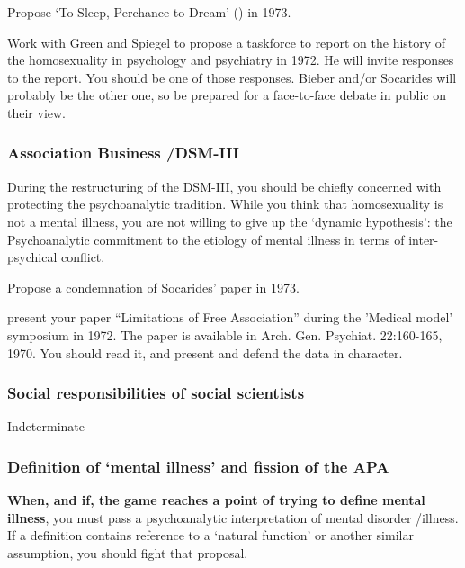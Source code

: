 \begin{refsection}
\begin{researchtask}[Marmor]\label{researchtask:marmor}Propose ‘To Sleep, Perchance to Dream’ () in 1973.
\end{researchtask}

Work with Green and Spiegel to propose a taskforce to report on the history of the homosexuality in psychology and psychiatry in 1972. He will invite responses to the report. You should be one of those responses. Bieber and\slash or Socarides will probably be the other one, so be prepared for a face-to-face debate in public on their view.

\subsubsection{Association Business \slash  DSM-III}
\label{associationbusinessdsm-iii}

During the restructuring of the DSM-III, you should be chiefly concerned with protecting the psychoanalytic tradition. While you think that homosexuality is not a mental illness, you are not willing to give up the `dynamic hypothesis': the Psychoanalytic commitment to the etiology of mental illness in terms of inter-psychical conflict.

Propose a condemnation of Socarides’ paper in 1973.
\begin{writingtask}[Marmor]\label{writingtask:marmor}
present your paper “Limitations of Free Association” during the 'Medical model' symposium in 1972. The paper is available in Arch. Gen. Psychiat. 22:160-165, 1970. You should read it, and present and defend the data in character.
\end{writingtask}

\subsubsection{Social responsibilities of social scientists}
\label{socialresponsibilitiesofsocialscientists}

Indeterminate

\subsubsection{Definition of ‘mental illness’ and fission of the APA}
\label{definitionof‘mentalillness’andfissionoftheapa}

\textbf{When, and if, the game reaches a point of trying to define mental illness}, you must pass a psychoanalytic interpretation of mental disorder \slash  illness. If a definition contains reference to a `natural function' or another similar assumption, you should fight that proposal.


\end{refsection}
